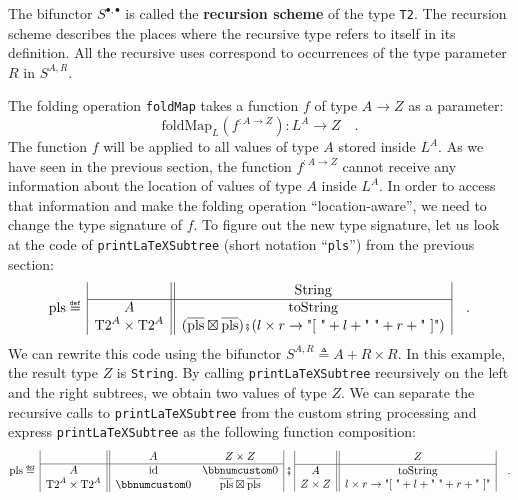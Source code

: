 The bifunctor $S^{\bullet,\bullet}$ is called the
\textbf{recursion scheme} of the type \lstinline!T2!.
The recursion scheme describes the places where the recursive type
refers to itself in its definition. All the recursive uses correspond
to occurrences of the type parameter $R$ in $S^{A,R}$. 

The folding operation \lstinline!foldMap! takes a function $f$ of
type $A\rightarrow Z$ as a parameter:
\[
\text{foldMap}_{L}(f^{:A\rightarrow Z}):L^{A}\rightarrow Z\quad.
\]
The function $f$ will be applied to all values of type $A$ stored
inside $L^{A}$. As we have seen in the previous section, the function
$f^{:A\rightarrow Z}$ cannot receive any information about the location
of values of type $A$ inside $L^{A}$. In order to access that information
and make the folding operation \textsf{``}location-aware\textsf{''}, we need to change
the type signature of $f$. To figure out the new type signature,
let us look at the code of \lstinline!printLaTeXSubtree! (short notation
\textsf{``}\lstinline!pls!\textsf{''}) from the previous section:
\[
\text{pls}\triangleq\,\begin{array}{|c||c|}
 & \text{String}\\
\hline A & \text{toString}\\
\text{T2}^{A}\times\text{T2}^{A} & (\overline{\text{pls}}\boxtimes\overline{\text{pls}})\bef(l\times r\rightarrow\text{"[ "}+l+\text{" "}+r+\text{" ]"})
\end{array}\quad.
\]
We can rewrite this code using the bifunctor $S^{A,R}\triangleq A+R\times R$.
In this example, the result type $Z$ is \lstinline!String!. By calling
\lstinline!printLaTeXSubtree! recursively on the left and the right
subtrees, we obtain two values of type $Z$. We can separate the recursive
calls to \lstinline!printLaTeXSubtree! from the custom string processing
and express \lstinline!printLaTeXSubtree! as the following function
composition:
\[
\text{pls}\triangleq\,\begin{array}{|c||cc|}
 & A & Z\times Z\\
\hline A & \text{id} & \bbnum 0\\
\text{T2}^{A}\times\text{T2}^{A} & \bbnum 0 & \overline{\text{pls}}\boxtimes\overline{\text{pls}}
\end{array}\,\bef\,\begin{array}{|c||c|}
 & Z\\
\hline A & \text{toString}\\
Z\times Z & l\times r\rightarrow\text{"[ "}+l+\text{" "}+r+\text{" ]"}
\end{array}\quad.
\]
